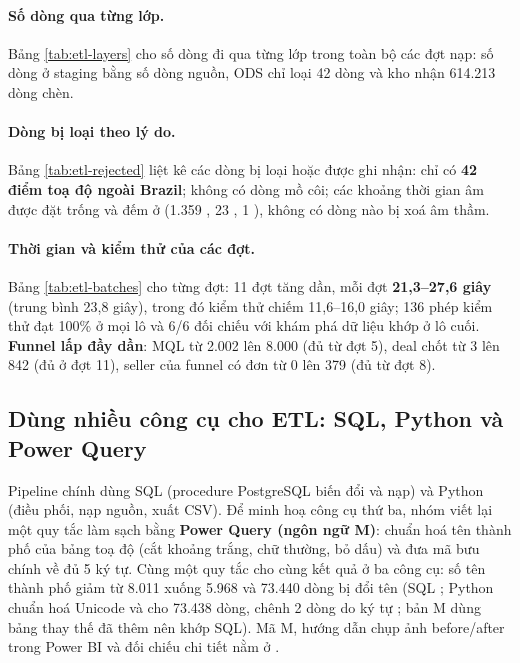 \paragraph{Số dòng qua từng lớp.} Bảng \ref{tab:etl-layers} cho số dòng đi qua từng lớp trong toàn bộ các đợt nạp: số dòng ở staging bằng số dòng nguồn, ODS chỉ loại 42 dòng và kho nhận 614.213 dòng chèn.


\paragraph{Dòng bị loại theo lý do.} Bảng \ref{tab:etl-rejected} liệt kê các dòng bị loại hoặc được ghi nhận: chỉ có \textbf{42 điểm toạ độ ngoài Brazil}; không có dòng mồ côi; các khoảng thời gian âm được đặt trống và đếm ở  (1.359 , 23 , 1 ), không có dòng nào bị xoá âm thầm.


\paragraph{Thời gian và kiểm thử của các đợt.} Bảng \ref{tab:etl-batches} cho từng đợt: 11 đợt tăng dần, mỗi đợt \textbf{21,3--27,6 giây} (trung bình 23,8 giây), trong đó kiểm thử chiếm 11,6--16,0 giây; 136 phép kiểm thử đạt 100\% ở mọi lô và 6/6 đối chiếu với khám phá dữ liệu khớp ở lô cuối. \textbf{Funnel lấp đầy dần}: MQL từ 2.002 lên 8.000 (đủ từ đợt 5), deal chốt từ 3 lên 842 (đủ ở đợt 11), seller của funnel có đơn từ 0 lên 379 (đủ từ đợt 8).


\subsection{Dùng nhiều công cụ cho ETL: SQL, Python và Power Query}\label{sec:etl-nhieu-cong-cu}
Pipeline chính dùng SQL (procedure PostgreSQL biến đổi và nạp) và Python (điều phối, nạp nguồn, xuất CSV). Để minh hoạ công cụ thứ ba, nhóm viết lại một quy tắc làm sạch bằng \textbf{Power Query (ngôn ngữ M)}: chuẩn hoá tên thành phố của bảng toạ độ (cắt khoảng trắng, chữ thường, bỏ dấu) và đưa mã bưu chính về đủ 5 ký tự. Cùng một quy tắc cho cùng kết quả ở ba công cụ: số tên thành phố giảm từ 8.011 xuống 5.968 và 73.440 dòng bị đổi tên (SQL ; Python chuẩn hoá Unicode và cho 73.438 dòng, chênh 2 dòng do ký tự ; bản M dùng bảng thay thế đã thêm  nên khớp SQL). Mã M, hướng dẫn chụp ảnh before/after trong Power BI và đối chiếu chi tiết nằm ở .
